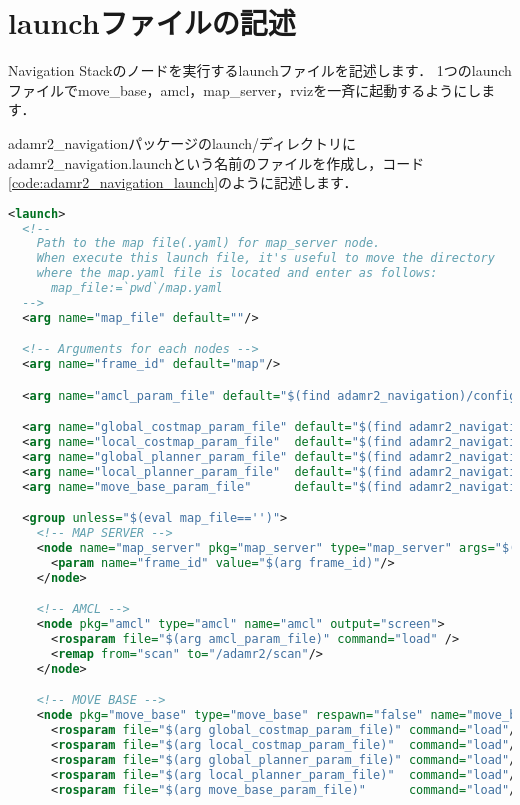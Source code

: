 \documentclass[{../../master}]{subfiles}
\begin{document}
\section{launchファイルの記述}

Navigation Stackのノードを実行するlaunchファイルを記述します．
1つのlaunchファイルで\textsf{move\_base}，\textsf{amcl}，\textsf{map\_server}，\textsf{rviz}を一斉に起動するようにします．

\textsf{adamr2\_navigation}パッケージの\textsf{launch/}ディレクトリに\textsf{adamr2\_navigation.launch}という名前のファイルを作成し，コード\ref{code:adamr2_navigation_launch}のように記述します．

\begin{lstlisting}[language=XML, label=code:adamr2_navigation_launch, caption=\textsf{adamr2\_navigation.launch}]
<launch>
  <!--
    Path to the map file(.yaml) for map_server node.
    When execute this launch file, it's useful to move the directory
    where the map.yaml file is located and enter as follows:
      map_file:=`pwd`/map.yaml
  -->
  <arg name="map_file" default=""/>

  <!-- Arguments for each nodes -->
  <arg name="frame_id" default="map"/>

  <arg name="amcl_param_file" default="$(find adamr2_navigation)/config/amcl/amcl.yml"/>

  <arg name="global_costmap_param_file" default="$(find adamr2_navigation)/config/costmap/global_costmap.yml"/>
  <arg name="local_costmap_param_file"  default="$(find adamr2_navigation)/config/costmap/local_costmap.yml"/>
  <arg name="global_planner_param_file" default="$(find adamr2_navigation)/config/planner/global/global_planner.yml"/>
  <arg name="local_planner_param_file"  default="$(find adamr2_navigation)/config/planner/local/trajectory_planner.yml"/>
  <arg name="move_base_param_file"      default="$(find adamr2_navigation)/config/move_base.yml"/>

  <group unless="$(eval map_file=='')">
    <!-- MAP SERVER -->
    <node name="map_server" pkg="map_server" type="map_server" args="$(arg map_file)">
      <param name="frame_id" value="$(arg frame_id)"/>
    </node>

    <!-- AMCL -->
    <node pkg="amcl" type="amcl" name="amcl" output="screen">
      <rosparam file="$(arg amcl_param_file)" command="load" />
      <remap from="scan" to="/adamr2/scan"/>
    </node>

    <!-- MOVE BASE -->
    <node pkg="move_base" type="move_base" respawn="false" name="move_base" output="screen">
      <rosparam file="$(arg global_costmap_param_file)" command="load"/>
      <rosparam file="$(arg local_costmap_param_file)"  command="load"/>
      <rosparam file="$(arg global_planner_param_file)" command="load"/>
      <rosparam file="$(arg local_planner_param_file)"  command="load"/>
      <rosparam file="$(arg move_base_param_file)"      command="load"/>


\end{lstlisting}
\end{document}
